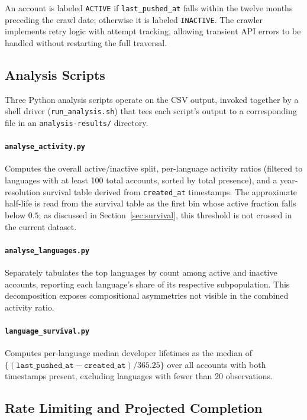 \documentclass[12pt,a4paper]{article}
\begin{document}
An account is labeled \texttt{ACTIVE} if \texttt{last\_pushed\_at} falls within
the twelve months preceding the crawl date; otherwise it is labeled
\texttt{INACTIVE}. The crawler implements retry logic with attempt tracking,
allowing transient API errors to be handled without restarting the full
traversal.

\subsection{Analysis Scripts}

Three Python analysis scripts operate on the CSV output, invoked together by a
shell driver (\texttt{run\_analysis.sh}) that tees each script's output to a
corresponding file in an \texttt{analysis-results/} directory.

\paragraph{\texttt{analyse\_activity.py}} Computes the overall active/inactive
split, per-language activity ratios (filtered to languages with at least 100
total accounts, sorted by total presence), and a year-resolution survival table
derived from \texttt{created\_at} timestamps. The approximate half-life is read
from the survival table as the first bin whose active fraction falls below $0.5$;
as discussed in Section~\ref{sec:survival}, this threshold is not crossed in the
current dataset.

\paragraph{\texttt{analyse\_languages.py}} Separately tabulates the top languages
by count among active and inactive accounts, reporting each language's share of
its respective subpopulation. This decomposition exposes compositional
asymmetries not visible in the combined activity ratio.

\paragraph{\texttt{language\_survival.py}} Computes per-language median developer
lifetimes as the median of
$\{(\texttt{last\_pushed\_at} - \texttt{created\_at}) / 365.25\}$
over all accounts with both timestamps present, excluding languages with fewer
than 20 observations.

\subsection{Rate Limiting and Projected Completion}
\end{document}
